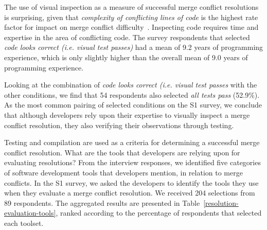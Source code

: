 The use of visual inspection as a measure of successful merge conflict resolutions is surprising, given that \textit{complexity of conflicting lines of code} is the highest rate factor for impact on merge conflict difficulty~\cite{mckee2017software}.
Inspecting code requires time and expertise in the area of conflicting code.
The survey respondents that selected \textit{code looks correct (i.e. visual test passes)} had a mean of 9.2 years of programming experience, which is only slightly higher than the overall mean of 9.0 years of programming experience.

Looking at the combination of \textit{code looks correct (i.e. visual test passes} with the other conditions, we find that 54 respondents also selected \textit{all tests pass} (52.9\%).
As the most common pairing of selected conditions on the S1 survey, we conclude that although developers rely upon their expertise to visually inspect a merge conflict resolution, they also verifying their observations through testing.


Testing and compilation are used as a criteria for determining a successful merge conflict resolution.
What are the tools that developers are relying upon for evaluating resolutions?
From the interview responses, we identified five categories of software development tools that developers mention, in relation to merge conflicts.
In the S1 survey, we asked the developers to identify the tools they use when they evaluate a merge conflict resolution.
We received 204 selections from 89 respondents.
The aggregated results are presented in Table~\ref{resolution-evaluation-tools}, ranked according to the percentage of respondents that selected each toolset.

